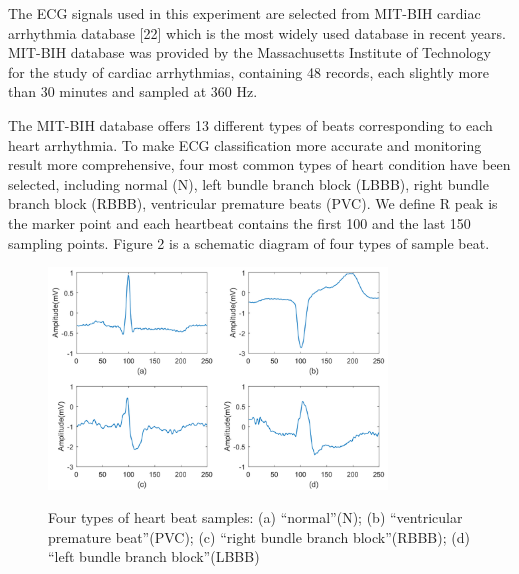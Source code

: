 \documentclass[journal]{IEEEtran}
\begin{document}
The ECG signals used in this experiment are selected from MIT-BIH cardiac arrhythmia database [22] which is the most widely used database in recent years. MIT-BIH  database was provided by the Massachusetts Institute of Technology for the study of cardiac arrhythmias, containing 48 records, each slightly more than 30 minutes and sampled at 360 Hz.

The MIT-BIH database offers 13 different types of beats corresponding to each heart arrhythmia. To make ECG classification more accurate and monitoring result more comprehensive, four most common types of heart condition have been selected, including normal (N), left bundle branch block (LBBB), right bundle branch block (RBBB), ventricular premature beats (PVC). We define R peak is the marker point and each heartbeat contains the first 100 and the last 150 sampling points. Figure 2 is a schematic diagram of four types of sample beat.


\begin{figure}[H]
	\centering
	\includegraphics[width=9cm]{beat3.pdf}\\
	\caption{Four types of heart beat samples: (a) ``normal''(N); (b) ``ventricular premature beat''(PVC); (c) ``right bundle branch block''(RBBB); (d) ``left bundle branch block''(LBBB)}
	\label{Doc2}
\end{figure}
\end{document}

